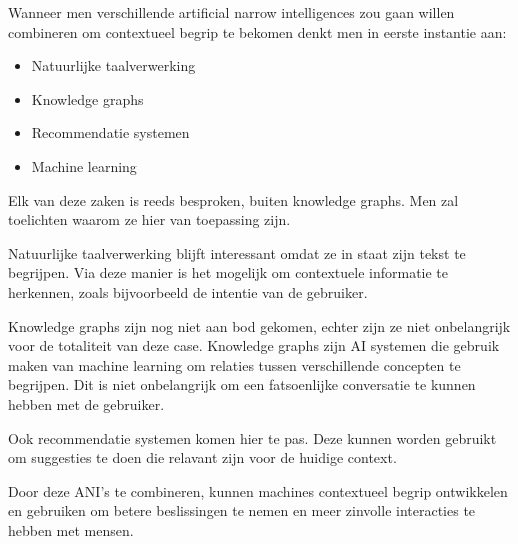 Wanneer men verschillende artificial narrow intelligences zou gaan willen combineren om contextueel begrip te bekomen denkt men in eerste instantie aan:

\begin{itemize}
    \item Natuurlijke taalverwerking
    \item Knowledge graphs
    \item Recommendatie systemen
    \item Machine learning
\end{itemize}

Elk van deze zaken is reeds besproken, buiten knowledge graphs. Men zal toelichten waarom ze hier van toepassing zijn.

Natuurlijke taalverwerking blijft interessant omdat ze in staat zijn tekst te begrijpen. Via deze manier is het mogelijk om contextuele informatie te herkennen, zoals bijvoorbeeld de intentie van de gebruiker.

Knowledge graphs zijn nog niet aan bod gekomen, echter zijn ze niet onbelangrijk voor de totaliteit van deze case. Knowledge graphs zijn AI systemen die gebruik maken van machine learning om relaties tussen verschillende concepten te begrijpen. Dit is niet onbelangrijk om een fatsoenlijke conversatie te kunnen hebben met de gebruiker.

Ook recommendatie systemen komen hier te pas. Deze kunnen worden gebruikt om suggesties te doen die relavant zijn voor de huidige context.

Door deze ANI's te combineren, kunnen machines contextueel begrip ontwikkelen en gebruiken om betere beslissingen te nemen en meer zinvolle interacties te hebben met mensen.
